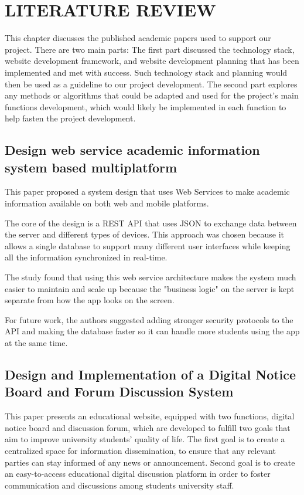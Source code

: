 \chapter{LITERATURE REVIEW}
	
This chapter discusses the published academic papers used to support our project. There are two main parts: The first part discussed the technology stack, website development framework, and website development planning that has been implemented and met with success. Such technology stack and planning would then be used as a guideline to our project development. The second part explores any methods or algorithms that could be adapted and used for the project’s main functions development, which would likely be implemented in each function to help fasten the project development.

\section{Design web service academic information system based multiplatform \cite{paper_10}}

This paper proposed a system design that uses Web Services to make academic information available on both web and mobile platforms.

The core of the design is a REST API that uses JSON to exchange data between the server and different types of devices. This approach was chosen because it allows a single database to support many different user interfaces while keeping all the information synchronized in real-time.

The study found that using this web service architecture makes the system much easier to maintain and scale up because the "business logic" on the server is kept separate from how the app looks on the screen.

For future work, the authors suggested adding stronger security protocols to the API and making the database faster so it can handle more students using the app at the same time.

\section{Design and Implementation of a Digital Notice Board and Forum Discussion System \cite{paper_11}}

This paper presents an educational website, equipped with two functions, digital notice board and discussion forum, which are developed to fulfill two goals that aim to improve university students' quality of life. The first goal is to create a centralized space for information dissemination, to ensure that any relevant parties can stay informed of any news or announcement. Second goal is to create an easy-to-access educational digital discussion platform in order to foster communication and discussions among students university staff. 


